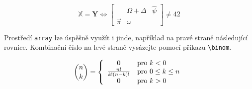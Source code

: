 \documentclass[hidelinks, 11pt, a4paper, twocolumn]{article}
\theoremstyle{definition}
\theoremstyle{definition}
\begin{document}
$$\mathbb{X}=\mathbf{Y}\Longleftrightarrow
\left[\begin{array}{ccc}
    &\Omega + \Delta & \hat{\psi} \\
    \vec{\pi} & \omega & 
\end{array}
\right] \neq 42$$

Prostředí \texttt{array} lze úspěšně využít i jinde,
 například na pravé straně následující rovnice. Kombinační číslo na levé straně vysázejte pomocí příkazu \verb|\binom|.

$$ \binom{n}{k} = \left\{
\begin{array}{c l}
0 & \text{pro } k < 0 \\
\frac{n!}{k!(n-k)!} & \text{pro } 0 \leq k \leq n \\
0 & \text{pro } k > 0
\end{array} \right. $$
\end{document}
